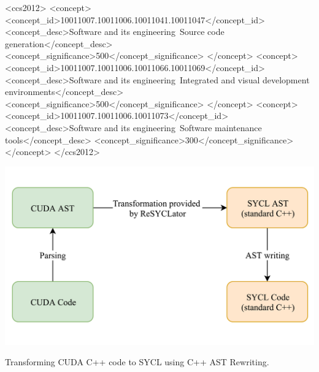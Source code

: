 \documentclass[sigconf]{acmart}
\begin{document}
%
%
\begin{CCSXML}
<ccs2012>
<concept>
<concept_id>10011007.10011006.10011041.10011047</concept_id>
<concept_desc>Software and its engineering~Source code generation</concept_desc>
<concept_significance>500</concept_significance>
</concept>
<concept>
<concept_id>10011007.10011006.10011066.10011069</concept_id>
<concept_desc>Software and its engineering~Integrated and visual development environments</concept_desc>
<concept_significance>500</concept_significance>
</concept>
<concept>
<concept_id>10011007.10011006.10011073</concept_id>
<concept_desc>Software and its engineering~Software maintenance tools</concept_desc>
<concept_significance>300</concept_significance>
</concept>
</ccs2012>
\end{CCSXML}


%

%
\begin{teaserfigure}
  \includegraphics[width=\textwidth]{ReSYCLatorSchemaSimple}
  \caption{Transforming CUDA C++ code to SYCL using C++ AST Rewriting.}
  \label{fig:teaser}
\end{teaserfigure}
\end{document}

